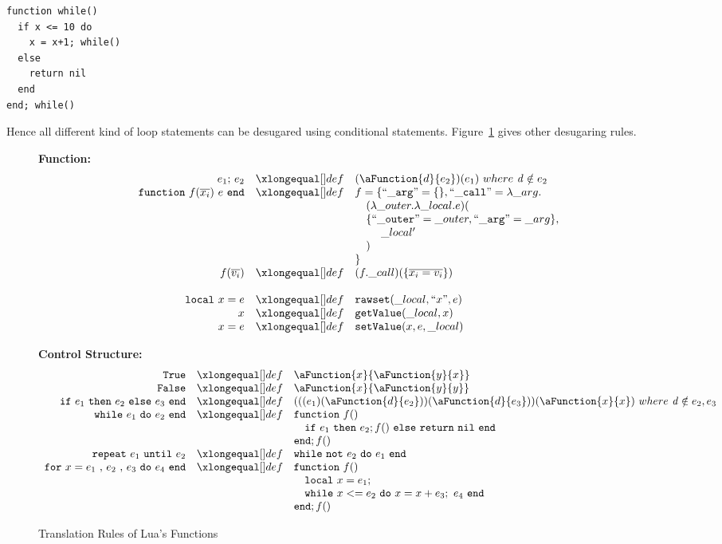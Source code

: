 \begin{verbatim}
function while()
  if x <= 10 do
    x = x+1; while()
  else
    return nil
  end
end; while()
\end{verbatim}

Hence all different kind of loop statements can be desugared using conditional statements. Figure~\ref{fig:desLuaFunc} gives other desugaring rules.

\begin{figure}
\caption{Translation Rules of Lua's Functions}\label{fig:desLuaFunc}
{\bf Function:}\[
\begin{array}{rclcl}
\desugar{e_1{\tt ;}~e_2}{(\aFunction{d}{e_2})(e_1)~where~{\it d} \notin e_2}
\desugar{{\tt function}~f(\overline{x_i})~e~{\tt end}}{f = \{ {\tt ``\_arg"} = \{\}, {\tt ``\_call"} = \lambda\_arg.}
\desugarline{
\quad(\lambda\_outer.\lambda\_local.e)(\\
\quad\{{\tt ``\_outer"} = \_outer, {\tt ``\_arg" }= \_arg\},\\
\quad\quad~\_local'\\
\quad)\\
\}
}
\desugar{f(\overline{v_i})}{(f.\_call)(\{\overline{x_i = v_i}\})}
\\
\desugar{{\tt local}~x=e}{{\tt rawset}(\_local, ``x", e)}
\desugar{x}{{\tt getValue}(\_local, x)}
\desugar{x=e}{{\tt setValue}(x, e, \_local)}

\end{array}\]


{\bf Control Structure:}\[
\begin{array}{rclcl}

\desugar{\tt True}{\aFunction{x}{\aFunction{y}{x}}}
\desugar{\tt False}{\aFunction{x}{\aFunction{y}{y}}}
\desugar{
{\tt if}~e_1~{\tt then}~e_2~{\tt else}~e_3~{\tt end}
}{
(((e_1)(\aFunction{d}{e_2}))(\aFunction{d}{e_3}))(\aFunction{x}{x})~where~{\it d} \notin e_2, e_3
}
\desugar{{\tt while}~e_1~{\tt do}~e_2~{\tt end}}{
{\tt function}~f()
}
\desugarline{ \quad{\tt if}~e_1~{\tt then}~e_2;f()~{\tt else}~{\tt return}~{\tt nil}~{\tt end}\\
{\tt end};f()
}
\desugar{{\tt repeat}~e_1~{\tt until}~e_2}{
{\tt while}~{\tt not}~e_2~{\tt do}~e_1~{\tt end}\\
}
\desugar{{\tt for}~x=e_1~{\tt ,}~e_2~{\tt ,}~e_3~{\tt do}~e_4~{\tt end}}{
{\tt function}~f()
}
\desugarline{
\quad {\tt local}~x = e_1;\\
\quad {\tt while}~x<= e_2~{\tt do}~x = x + e_3;~e_4~{\tt end}\\
{\tt end};f()\\
}
\end{array}\]
\end{figure}


